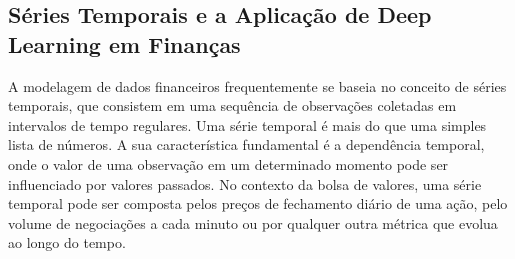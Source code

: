 







\subsection{Séries Temporais e a Aplicação de Deep Learning em Finanças}

A modelagem de dados financeiros frequentemente se baseia no conceito de  séries temporais, que consistem em uma sequência de observações coletadas em intervalos de tempo regulares. Uma série temporal é mais do que uma simples lista de números. A sua característica fundamental é a dependência temporal, onde o valor de uma observação em um determinado momento pode ser influenciado por valores passados. No contexto da bolsa de valores, uma série temporal pode ser composta pelos preços de fechamento diário de uma ação, pelo volume de negociações a cada minuto ou por qualquer outra métrica que evolua ao longo do tempo.

